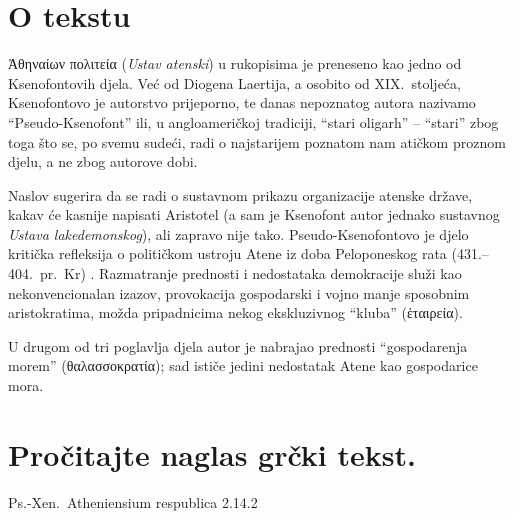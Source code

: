


\section*{O tekstu}
Ἀθηναίων πολιτεία (\textit{Ustav atenski}) u rukopisima je preneseno kao jedno od Ksenofontovih djela. Već od Diogena Laertija, a osobito od XIX.~stoljeća, Ksenofontovo je autorstvo prijeporno, te danas nepoznatog autora nazivamo ``Pseudo-Ksenofont'' ili, u angloameričkoj tradiciji, ``stari oligarh'' – ``stari'' zbog toga što se, po svemu sudeći, radi o najstarijem poznatom nam atičkom proznom djelu, a ne zbog autorove dobi.

Naslov sugerira da se radi o sustavnom prikazu organizacije atenske države, kakav će kasnije napisati Aristotel (a sam je Ksenofont autor jednako sustavnog \textit{Ustava lakedemonskog}), ali zapravo nije tako. Pseudo-Ksenofontovo je djelo kritička refleksija o političkom ustroju Atene iz doba Peloponeskog rata  (431.–404.\ pr.~Kr) . Razmatranje prednosti i nedostataka demokracije služi kao nekonvencionalan izazov, provokacija gospodarski i vojno manje sposobnim aristokratima, možda pripadnicima nekog ekskluzivnog ``kluba'' \textgreek[variant=ancient]{(ἑταιρεία).}

U drugom od tri poglavlja djela autor je nabrajao prednosti ``gospodarenja morem'' \textgreek[variant=ancient]{(θαλασσοκρατία);} sad ističe jedini nedostatak Atene kao gospodarice mora.


\newpage

\section*{Pročitajte naglas grčki tekst.}
Ps.-Xen.\ Atheniensium respublica 2.14.2

\medskip


